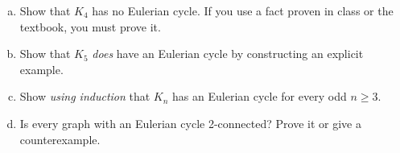 \documentclass{amsart}
\begin{document}
	\begin{enumerate}[(a)]
		\item Show that $K_4$ has no Eulerian cycle. If you use a fact proven in class or the textbook, you must prove it. \vspace{120px}
		
		\item Show that $K_5$ \textit{does} have an Eulerian cycle by constructing an explicit example. \vspace{150px}
		
		\item Show \textit{using induction} that $K_n$ has an Eulerian cycle for every odd $n\geq 3$. \vspace{170px}
		
		\item Is every graph with an Eulerian cycle 2-connected? Prove it or give a counterexample.
	\end{enumerate}
\end{document}
